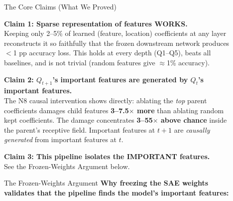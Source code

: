 \documentclass[final]{beamer}
\newlength{\sepwidth}
\newlength{\colwidth}
\newcommand{\separatorcolumn}{\begin{column}{\sepwidth}\end{column}}
\begin{document}
\begin{frame}[t]
\begin{columns}[t]
\begin{column}{\colwidth}
\end{column}
\separatorcolumn

\begin{column}{\colwidth}

\begin{alertblock}{The Core Claims (What We Proved)}
\small

\textbf{Claim 1: Sparse representation of features WORKS.}\\
Keeping only 2--5\% of learned (feature, location) coefficients at any layer
reconstructs it so faithfully that the frozen downstream network produces
$<$1 pp accuracy loss.  This holds at every depth (Q1--Q5), beats all baselines,
and is not trivial (random features give $\approx$1\% accuracy).

\vspace{0.5em}
\textbf{Claim 2: $Q_{t+1}$'s important features are generated by $Q_t$'s important features.}\\
The N8 causal intervention shows directly: ablating the \emph{top} parent
coefficients damages child features \textbf{3--7.5$\times$ more} than ablating random
kept coefficients.  The damage concentrates \textbf{3--55$\times$ above chance} inside
the parent's receptive field.  Important features at $t{+}1$ are \emph{causally generated}
from important features at $t$.

\vspace{0.5em}
\textbf{Claim 3: This pipeline isolates the IMPORTANT features.}\\
See the Frozen-Weights Argument below.
\end{alertblock}

\vspace{0.5em}

\begin{block}{The Frozen-Weights Argument}
\small
\textbf{Why freezing the SAE weights validates that the pipeline finds the model's important features:}


\end{block}
\end{column}
\end{columns}
\end{frame}
\end{document}
